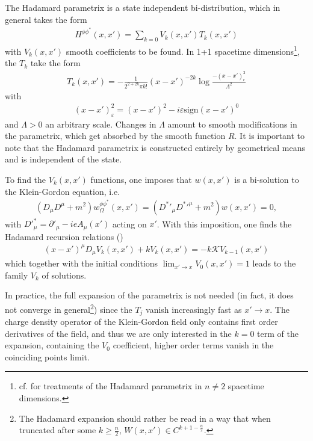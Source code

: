 The Hadamard parametrix is a state independent bi-distribution, which in general takes the form
\begin{align}
H^{\phi\phi^*}(x, x') = \sum_{k=0}^{} V_k(x, x') T_k(x, x')
\label{eq:hadamard-expansion}
\end{align}
with $V_k(x, x')$ smooth coefficients to be found. In 1+1 spacetime dimensions\footnote{cf.  \cite{D_canini_2008} for treatments of the Hadamard parametrix in $n\neq 2$ spacetime dimensions.}, the $T_k$ take the form
\begin{align}
	T_k(x,x') = 
	-\frac{1}{ 2^{2+2k}\pi k!} (x-x') ^{  -2k} \log \frac{-(x-x')_\epsilon^2}{\Lambda^2}  
\end{align}
with  
\begin{align}
	 (x-x')^2_\varepsilon = (x-x')^2 - i\varepsilon \text{sign} (x-x')^0
\end{align}
and $\Lambda>0$ an arbitrary scale. Changes in $\Lambda$ amount to smooth modifications in the parametrix, which get absorbed by the smooth function $R$.
It is important to note that the Hadamard parametrix is constructed entirely by geometrical means and is independent of the state. 


To find the $V_k( x, x')$  functions, one imposes that $w(x, x')$ is a bi-solution to the Klein-Gordon equation, i.e. 
\begin{align}
	(D_\mu D^\mu  + m^2)w^{\phi \phi^*}_\Omega(x, x') = ( D^*'_\mu D^*'^{\mu} + m^2)w(x, x') = 0,
\end{align}
with $D'^*_\mu = \partial'_\mu - ieA_\mu(x')$ acting on  $x'$.
With this imposition, one finds the Hadamard recursion relations (\cite{dewitt1960radiation, Schl2015})
\begin{align}
    (x-x')^\mu D_\mu V_k(x, x') + k V_k(x, x') = -k \mathcal{K} V_{k-1}(x, x')
    \label{eq:transport-equation}
\end{align}
which together with the initial conditions \newline $\lim_{x' \to x} V_0(x, x') = 1$ leads to the family $V_k$ of solutions. 

In practice, the full expansion of the parametrix is not needed (in fact, it does not converge in general\footnote{The Hadamard expansion should rather be read in a way that when truncated after some $k\geq \frac{n}{2}$, $W(x, x') \in C^{k+1 -\frac{n}{2}}$.}) since the $T_j$ vanish increasingly fast as $x'\to x$. The charge density operator of the Klein-Gordon field only contains first order derivatives of the field, and thus we are only interested in the $k=0$ term of the expansion, containing the $V_0$ coefficient, higher order terms vanish in the coinciding points limit.

